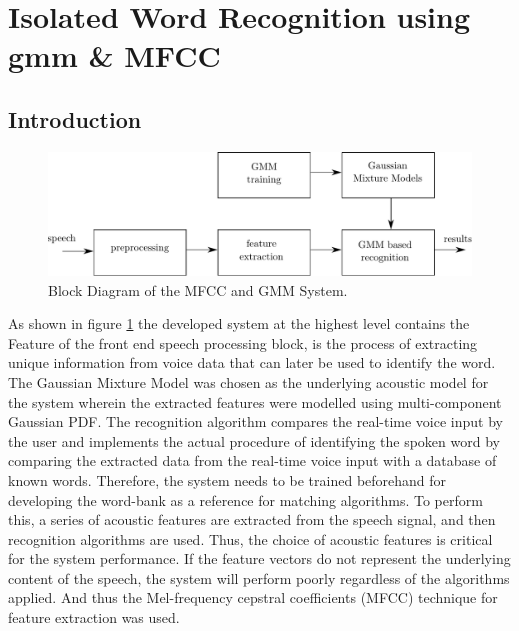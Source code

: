 \documentclass[12pt, a4paper, twoside]{report}
\begin{document}
\section{Isolated Word Recognition using \acrshort{gmm} \& MFCC}
\subsection{Introduction}
\begin{figure}[!h]
	\centering
	\includegraphics[width=1\textwidth]
	{images/chapter5/gmm-diagram}
	\caption{Block Diagram of the MFCC and GMM System.}
	\label{fig:gmm-diagram}
\end{figure}

As shown in figure \ref{fig:gmm-diagram} the developed system at the highest level contains the Feature  of the front end speech processing block, is the process of extracting unique information from voice data that can later be used to identify the word. The Gaussian Mixture Model was chosen as the underlying acoustic model for the system wherein the extracted features were modelled using multi-component Gaussian PDF. The recognition algorithm compares the real-time voice input by the user and implements the actual procedure of identifying the spoken word by comparing the extracted data from the real-time voice input with a database of known words. Therefore, the system needs to be trained beforehand for developing the word-bank as a reference for matching algorithms. To perform this, a series of acoustic features are extracted from the speech signal, and then recognition algorithms are used. Thus, the choice of acoustic features is critical for the system performance. If the feature vectors do not represent the underlying content of the speech, the system will perform poorly regardless of the algorithms applied. And thus the Mel-frequency cepstral coefficients (MFCC) technique for feature extraction was used.
\end{document}
